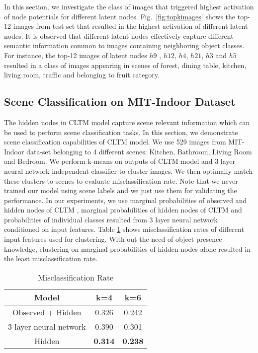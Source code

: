 \documentclass{article}
\begin{document}
In this section, we investigate the class of images that triggered highest activation of node potentials for different latent nodes. Fig.~\ref{fig:topkimages} shows the top-12  images from test set that resulted in the highest activation of different latent nodes. It is observed that different latent nodes effectively capture different semantic information common to images containing neighboring object classes. For instance, the top-12 images of latent nodes $h9$ , $h12$, $h4$, $h21$, $h3$ and $h5$ resulted in a class of images appearing in scenes of forest, dining table, kitchen, living room, traffic and  belonging to fruit category.




\subsection{Scene Classification on MIT-Indoor Dataset}

The hidden nodes in CLTM model capture scene relevant information which can be used to perform scene classification tasks. In this section, we demonstrate scene classification capabilities of CLTM model. We use 529 images from MIT-Indoor data-set belonging to 4 different scenes: Kitchen, Bathroom, Living Room  and Bedroom. We perform k-means on outputs of CLTM model and 3 layer neural network independent classifier to cluster images. We then optimally match these clusters to scenes to evaluate misclassification rate. Note that we never trained our model using scene labels and we just use them for validating the performance. In our experiments, we use marginal  probabilities of observed and hidden nodes of CLTM , marginal probabilities of hidden nodes of CLTM  and probabilities of individual classes resulted from 3 layer neural network conditioned on input features. Table \ref{table:k-means} shows misclassification rates of different input features used for clustering.
With out the need of object presence knowledge, clustering on marginal probabilities of hidden nodes alone resulted in the least misclassification rate.


\begin{table}[ht]
\caption{Misclassification Rate}

\vspace{-0.15in}


\centering
\begin{tabular}{|c c c| }
\hline\hline
Model & k=4 & k=6  \\ [0.3ex]
\hline
Observed + Hidden & 0.326 & 0.242  \\
3 layer neural network & 0.390 & 0.301  \\
Hidden & \textbf{0.314} & \textbf{0.238}  \\
\hline
\end{tabular}
\label{table:k-means}
\end{table}
\end{document}
